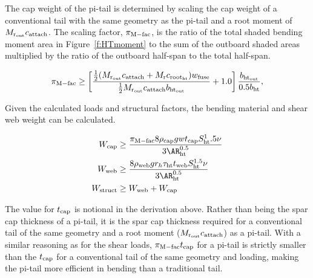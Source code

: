 The cap weight of the pi-tail is determined by scaling the cap weight of a 
conventional tail with the same geometry as the pi-tail and a root moment of 
$M_{\rm{r}_{\rm{out}}} c_{\rm{attach}}$. The scaling factor, $\pi_{\rm{M-fac}}$, is the ratio of the 
total shaded bending moment area in Figure~\ref{f:HTmoment} to the sum of the
outboard shaded areas multiplied by the ratio of the outboard half-span to the 
total half-span.

\begin{equation}
    \pi_{\rm{M-fac}} \geq \left[\frac{\frac{1}{2}(M_{\rm{r}_{\rm{out}}} c_{\rm{attach}} +
    M_{\rm{r}} c_{\rm{root}_{\rm{ht}}}) w_{\textrm{fuse}}} {\frac{1}{2}M_{\rm{r}_{\rm{out}}} c_{\rm{attach}} 
b_{\rm{ht}_{\rm{out}}}} + 1.0\right]
    \frac{b_{\rm{ht}_{\rm{out}}}} {0.5b_{\rm{ht}}},
\end{equation}

Given the calculated loads and structural factors, the bending material and 
shear web weight can be calculated. 

\begin{align}
    W_{\rm{cap}} &\geq \frac{\pi_{\rm{M-fac}} 8 \rho_{\rm{cap}} g w t_{\rm{cap}} S_{\rm{ht}}^1.5 \nu}
    {3\AR_{\rm{ht}}^{0.5}}\\
    W_{\rm{web}} &\geq \frac{8 \rho_{\rm{web}} g r_h \tau_{\rm{ht}} t_{\rm{web}} S_{\rm{ht}}^{1.5} 
\nu}{3\AR_{\rm{ht}}^{0.5}}\\
    W_{\rm{struct}} &\geq W_{\rm{web}} + W_{\rm{cap}}
\end{align}

The value for $t_{\rm{cap}}$ is notional in the derivation above. Rather than being 
the spar cap thickness of a pi-tail, it is the spar cap thickness required for a 
conventional tail of the same geometry and a root moment  ($M_{\rm{r}_{\rm{out}}} 
c_{\rm{attach}}$) as a pi-tail. With a similar reasoning as for the shear loads, 
$\pi_{\rm{M-fac}} t_{\rm{cap}}$ for a pi-tail is strictly smaller than the $t_{\rm{cap}}$ for a 
conventional tail of the same geometry and loading, making the pi-tail more 
efficient in bending than a traditional tail. 
